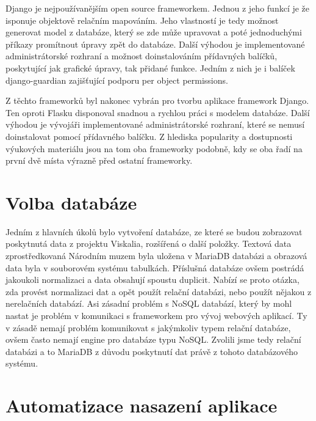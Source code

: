 Django je nejpoužívanějším open source frameworkem. Jednou z jeho funkcí je že 
isponuje objektově relačním mapováním. Jeho vlastností je tedy možnost generovat
model z databáze, který se zde může upravovat a poté jednoduchými
příkazy promítnout úpravy zpět do databáze. Další výhodou je implementované
administrátorské rozhraní a možnost doinstalováním přídavných balíčků,
poskytující jak grafické úpravy, tak přidané funkce. Jedním z nich je
i balíček django-guardian zajišťující podporu per object permissions. \cite{django}


Z těchto frameworků byl nakonec vybrán pro tvorbu aplikace framework
Django. Ten oproti Flasku disponoval snadnou a rychlou práci s modelem
databáze. Další výhodou je vývojáři implementované administrátorské
rozhraní, které se nemusí doinstalovat pomocí přídavného balíčku. Z
hlediska popularity a dostupnosti výukových materiálu jsou na tom oba
frameworky podobně, kdy se oba řadí na první dvě místa výrazně před
ostatní frameworky.

\vspace{10px}

\section{Volba databáze}

Jedním z hlavních úkolů bylo vytvoření databáze, ze které se budou
zobrazovat poskytnutá data z projektu Viskalia, rozšířená o další
položky. Textová data zprostředkovaná Národním muzem byla uložena 
v MariaDB databázi a obrazová data byla v souborovém systému
tabulkách. Příslušná databáze ovšem postrádá jakoukoli normalizaci a
data obsahují spoustu duplicit. Nabízí se proto otázka, zda provést
normalizaci dat a opět použít relační databázi, nebo použít nějakou z
nerelačních databází. Asi zásadní problém s NoSQL databází, který by
mohl nastat je problém v komunikaci s frameworkem pro vývoj webových
aplikací. Ty v zásadě nemají problém komunikovat s jakýmkoliv typem
relační databáze, ovšem často nemají engine pro databáze typu
NoSQL. Zvolili jsme tedy relační databázi a to MariaDB z důvodu poskytnutí 
dat právě z tohoto databázového systému. \cite{django} \cite{mariadb}

\section{Automatizace nasazení aplikace}

